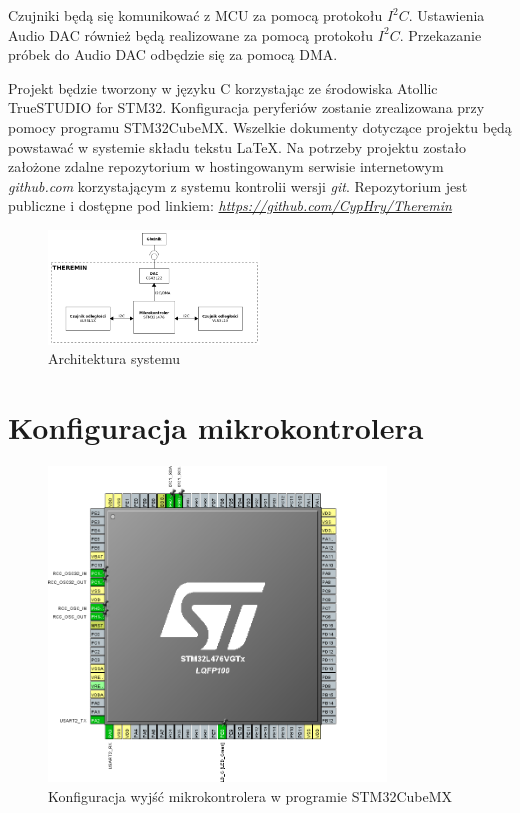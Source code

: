 \documentclass[10pt, a4paper]{article}
\begin{document}
Czujniki będą się komunikować z MCU za pomocą protokołu $I^2C$. Ustawienia Audio DAC również będą realizowane za pomocą protokołu $I^2C$. Przekazanie próbek do Audio DAC odbędzie się za pomocą DMA.


Projekt będzie tworzony w języku C korzystając ze środowiska Atollic TrueSTUDIO for STM32. Konfiguracja peryferiów zostanie zrealizowana przy pomocy programu STM32CubeMX. Wszelkie dokumenty dotyczące projektu będą powstawać w systemie składu tekstu \LaTeX. Na potrzeby projektu zostało założone zdalne repozytorium w hostingowanym serwisie internetowym \textit{github.com} korzystającym z systemu kontrolii wersji \textit{git}. Repozytorium jest publiczne i dostępne pod linkiem: \href{https://cyphry.github.io/dron/}{\textit{https://github.com/CypHry/Theremin}}
\begin{figure}[H]
	\centering
	\includegraphics[width=0.5\textwidth]{architektura.png}
	\caption{Architektura systemu}
	\label{fig:Architektura}
\end{figure}



 
\section{Konfiguracja mikrokontrolera}

\begin{figure}[H]
	\centering
	\includegraphics[width=0.8\textwidth]{konfiguracja_mcu.png}
	\caption{Konfiguracja wyjść mikrokontrolera w programie STM32CubeMX}
	\label{fig:KonfiguracjaMikrokontrolera}
\end{figure}
\end{document}
